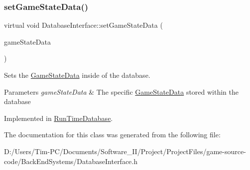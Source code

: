 \subsubsection{\texorpdfstring{set\+Game\+State\+Data()}{setGameStateData()}}
{\footnotesize\ttfamily virtual void Database\+Interface\+::set\+Game\+State\+Data (\begin{DoxyParamCaption}\item[{\hyperlink{struct_game_state_data}{Game\+State\+Data}}]{game\+State\+Data }\end{DoxyParamCaption})\hspace{0.3cm}{\ttfamily [pure virtual]}}



Sets the \hyperlink{struct_game_state_data}{Game\+State\+Data} inside of the database. 


\begin{DoxyParams}{Parameters}
{\em game\+State\+Data} & The specific \hyperlink{struct_game_state_data}{Game\+State\+Data} stored within the database \\
\hline
\end{DoxyParams}


Implemented in \hyperlink{class_run_time_database_af18f09a5166adc6ab075034e272e9c8d}{Run\+Time\+Database}.



The documentation for this class was generated from the following file\+:\begin{DoxyCompactItemize}
\item 
D\+:/\+Users/\+Tim-\/\+P\+C/\+Documents/\+Software\+\_\+\+I\+I/\+Project/\+Project\+Files/game-\/source-\/code/\+Back\+End\+Systems/Database\+Interface.\+h\end{DoxyCompactItemize}
